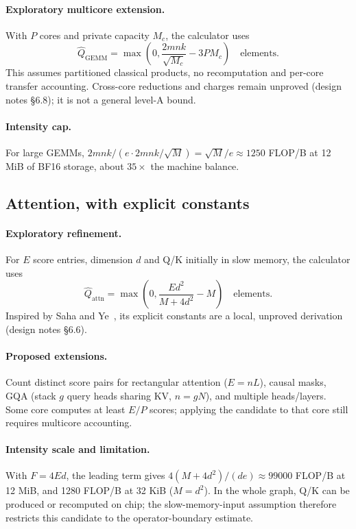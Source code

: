 \documentclass[11pt]{article}
\theoremstyle{definition}
\theoremstyle{remark}
\begin{document}
\paragraph{Exploratory multicore extension.}
With $P$ cores and private capacity $M_c$, the calculator uses
\begin{equation}
\widehat Q_{\mathrm{GEMM}}=\max\left(0,\frac{2mnk}{\sqrt{M_c}}-3PM_c\right)\quad\text{elements.}
\end{equation}
This assumes partitioned classical products, no recomputation and per-core transfer accounting.
Cross-core reductions and charges remain unproved (design notes \S6.8); it is not a general level-A bound.
\paragraph{Intensity cap.}
For large GEMMs, $2mnk/(e\cdot2mnk/\sqrt{M})=\sqrt{M}/e\approx1250$ FLOP/B at 12 MiB
of BF16 storage, about $35\times$ the machine balance.

\subsection{Attention, with explicit constants}
\paragraph{Exploratory refinement.}\label{est:attn}
For $E$ score entries, dimension $d$ and Q/K initially in slow memory, the calculator uses
\begin{equation}
\widehat Q_{\mathrm{attn}}=\max\left(0,\frac{Ed^2}{M+4d^2}-M\right)\quad\text{elements.}
\end{equation}
Inspired by Saha and Ye~\cite{sahaye}, its explicit constants are a local, unproved derivation
(design notes \S6.6).
\paragraph{Proposed extensions.}
Count distinct score pairs for rectangular attention ($E=nL$), causal masks, GQA (stack $g$ query
heads sharing KV, $n=gN$), and multiple heads/layers. Some core computes at least $E/P$ scores;
applying the candidate to that core still requires multicore accounting.
\paragraph{Intensity scale and limitation.}
With $F=4Ed$, the leading term gives $4(M+4d^2)/(de)\approx99000$ FLOP/B at 12 MiB,
and 1280 FLOP/B at 32 KiB ($M=d^2$). In the whole graph, Q/K can be produced or recomputed on chip;
the slow-memory-input assumption therefore restricts this candidate to the operator-boundary estimate.
\end{document}
